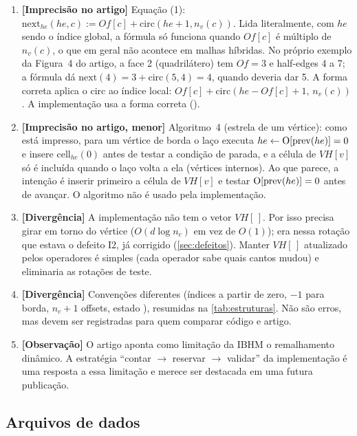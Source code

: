 \begin{enumerate}[label=\textbf{C\arabic*.}, leftmargin=2.3em]
\item \textbf{[Imprecisão no artigo]} Equação (1): $\mathrm{next}_{he}(he,c):=Of[c]+\mathrm{circ}(he+1,n_v(c))$. Lida
literalmente, com $he$ sendo o índice global, a fórmula só funciona quando $Of[c]$ é múltiplo de $n_v(c)$, o que em
geral não acontece em malhas híbridas. No próprio exemplo da Figura~4 do artigo, a face 2 (quadrilátero) tem $Of=3$ e
half-edges 4 a 7; a fórmula dá $\mathrm{next}(4)=3+\mathrm{circ}(5,4)=4$, quando deveria dar 5. A forma correta aplica
o $\mathrm{circ}$ ao índice local: $Of[c]+\mathrm{circ}(he-Of[c]+1,\,n_v(c))$. A implementação usa a forma correta
().
\item \textbf{[Imprecisão no artigo, menor]} Algoritmo~4 (estrela de um vértice): como está impresso, para um vértice
de borda o laço executa $he\leftarrow\mathrm{O}[\mathrm{prev}(he)]=0$ e insere $\mathrm{cell}_{he}(0)$ antes de testar a condição de
parada, e a célula de $VH[v]$ só é incluída quando o laço volta a ela (vértices internos). Ao que parece, a intenção é
inserir primeiro a célula de $VH[v]$ e testar $\mathrm{O}[\mathrm{prev}(he)]=0$ antes de avançar. O algoritmo não é usado pela
implementação.
\item \textbf{[Divergência]} A implementação não tem o vetor $VH[\,]$. Por isso  precisa girar em torno
do vértice ($O(d\log n_c)$ em vez de $O(1)$); era nessa rotação que estava o defeito I2, já corrigido
(\cref{sec:defeitos}). Manter $VH[\,]$ atualizado pelos operadores é simples (cada operador sabe quais cantos mudou) e
eliminaria as rotações de teste.
\item \textbf{[Divergência]} Convenções diferentes (índices a partir de zero, $-1$ para borda, $n_c+1$ offsets, estado
\COLLAPSED), resumidas na \cref{tab:estruturas}. Não são erros, mas devem ser registradas para quem comparar código e
artigo.
\item \textbf{[Observação]} O artigo aponta como limitação da IBHM o remalhamento dinâmico. A estratégia
``contar $\to$ reservar $\to$ validar'' da implementação é uma resposta a essa limitação e merece ser destacada em uma
futura publicação.
\end{enumerate}

\subsection{Arquivos de dados}

